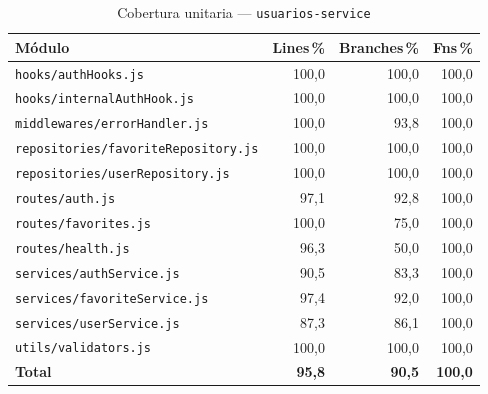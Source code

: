 \begin{table}[H]
  \centering
  \caption{Cobertura unitaria — \texttt{usuarios-service}}
  \label{tab:coverage-usuarios-unit}
  \begin{tabular}{lrrr}
    \toprule
    \textbf{Módulo}                             & \textbf{Lines\,\%} & \textbf{Branches\,\%} & \textbf{Fns\,\%} \\
    \midrule
    \texttt{hooks/authHooks.js}                 & 100,0              & 100,0                 & 100,0            \\
    \texttt{hooks/internalAuthHook.js}          & 100,0              & 100,0                 & 100,0            \\
    \texttt{middlewares/errorHandler.js}        & 100,0              & 93,8                  & 100,0            \\
    \texttt{repositories/favoriteRepository.js} & 100,0              & 100,0                 & 100,0            \\
    \texttt{repositories/userRepository.js}     & 100,0              & 100,0                 & 100,0            \\
    \texttt{routes/auth.js}                     & 97,1               & 92,8                  & 100,0            \\
    \texttt{routes/favorites.js}                & 100,0              & 75,0                  & 100,0            \\
    \texttt{routes/health.js}                   & 96,3               & 50,0                  & 100,0            \\
    \texttt{services/authService.js}            & 90,5               & 83,3                  & 100,0            \\
    \texttt{services/favoriteService.js}        & 97,4               & 92,0                  & 100,0            \\
    \texttt{services/userService.js}            & 87,3               & 86,1                  & 100,0            \\
    \texttt{utils/validators.js}                & 100,0              & 100,0                 & 100,0            \\
    \midrule
    \textbf{Total}                              & \textbf{95,8}      & \textbf{90,5}         & \textbf{100,0}   \\
    \bottomrule
  \end{tabular}
\end{table}

